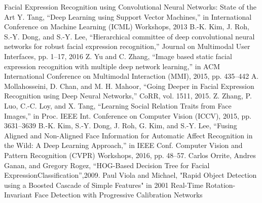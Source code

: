 \begin{enumerate}
 Facial Expression Recognition using Convolutional Neural Networks: State of the Art
Y. Tang, “Deep Learning using Support Vector Machines,” in International Conference on Machine Learning (ICML) Workshops, 2013
B.-K. Kim, J. Roh, S.-Y. Dong, and S.-Y. Lee, “Hierarchical committee
of deep convolutional neural networks for robust facial expression
recognition,” Journal on Multimodal User Interfaces, pp. 1–17, 2016
Z. Yu and C. Zhang, “Image based static facial expression recognition
with multiple deep network learning,” in ACM International Conference
on Multimodal Interaction (MMI), 2015, pp. 435–442
 A. Mollahosseini, D. Chan, and M. H. Mahoor, “Going Deeper in Facial
Expression Recognition using Deep Neural Networks,” CoRR, vol. 1511,
2015.
Z. Zhang, P. Luo, C.-C. Loy, and X. Tang, “Learning Social Relation
Traits from Face Images,” in Proc. IEEE Int. Conference on Computer
Vision (ICCV), 2015, pp. 3631–3639
 B.-K. Kim, S.-Y. Dong, J. Roh, G. Kim, and S.-Y. Lee, “Fusing Aligned
and Non-Aligned Face Information for Automatic Affect Recognition in
the Wild: A Deep Learning Approach,” in IEEE Conf. Computer Vision
and Pattern Recognition (CVPR) Workshops, 2016, pp. 48–57.
 Carlos Orrite, Andres Ganan, and Gregory Rogez, “HOG-Based Decision Tree for Facial ExpressionClassification”,2009.
 Paul Viola and Michael, "Rapid Object Detection using a Boosted Cascade of Simple Features" in 2001
 Real-Time Rotation-Invariant Face Detection with Progressive Calibration Networks
\end{enumerate}
